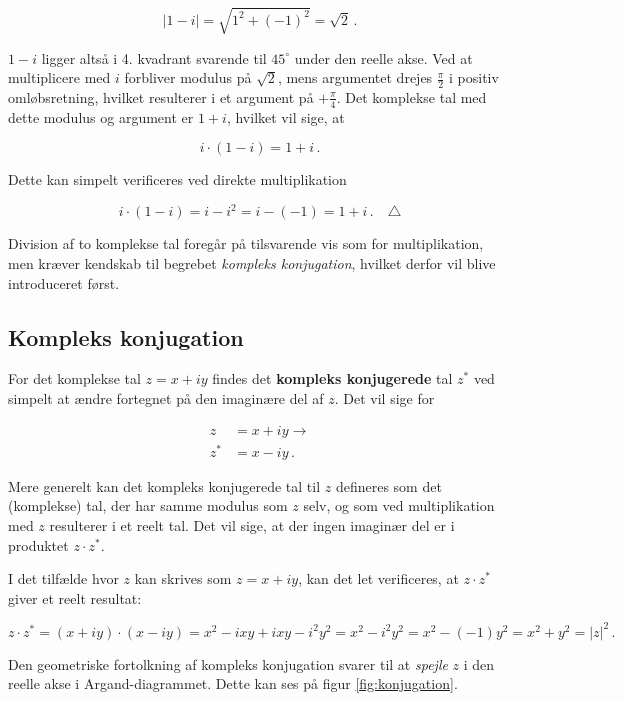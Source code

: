 \documentclass[a4paper, 12pt,titlepage]{article}
\begin{document}
$$|1-i| = \sqrt{1^2+(-1)^2} = \sqrt{2}\,.$$

\(1-i\) ligger altså i 4. kvadrant svarende til \(45^\circ\) under den reelle akse. Ved at multiplicere med \(i\) forbliver modulus på \(\sqrt{2}\), mens argumentet drejes \(\frac{\pi}{2}\) i positiv omløbsretning, hvilket resulterer i et argument på \(+\frac{\pi}{4}\). Det komplekse tal med dette modulus og argument er \(1+i\), hvilket vil sige, at

$$i\cdot(1-i) = 1+i\,.$$

Dette kan simpelt verificeres ved direkte multiplikation

$$i\cdot(1-i) = i - i^2 = i - (-1) = 1 +i \,. \quad \triangle$$

Division af to komplekse tal foregår på tilsvarende vis som for multiplikation, men kræver kendskab til begrebet \emph{kompleks konjugation}, hvilket derfor vil blive introduceret først.

\subsection{Kompleks konjugation}
\label{sec:org7b5e2b2}

For det komplekse tal \(z=x+iy\) findes det \textbf{kompleks konjugerede} tal \(z^*\) ved simpelt at ændre fortegnet på den imaginære del af \(z\). Det vil sige for

\begin{align*}
    z&=x+iy \to \\
    z^*&=x-iy \,.
\end{align*}

Mere generelt kan det kompleks konjugerede tal til \(z\) defineres som det (komplekse) tal, der har samme modulus som \(z\) selv, og som ved multiplikation med \(z\) resulterer i et reelt tal. Det vil sige, at der ingen imaginær del er i produktet \(z \cdot z^*\).

I det tilfælde hvor \(z\) kan skrives som \(z=x+iy\), kan det let verificeres, at \(z \cdot z^*\) giver et reelt resultat:

$$z \cdot z^* = (x+iy) \cdot (x-iy) = x^2 -ixy +ixy -i^2 y^2 = x^2 -i^2 y^2 = x^2 -(-1) y^2 = x^2+y^2 = |z|^2 \,.$$

Den geometriske fortolkning af kompleks konjugation svarer til at \emph{spejle} \(z\) i den reelle akse i Argand-diagrammet. Dette kan ses på figur \ref{fig:konjugation}.
\end{document}
